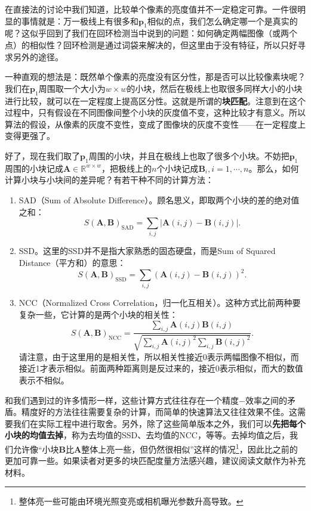 在直接法的讨论中我们知道，比较单个像素的亮度值并不一定稳定可靠。一件很明显的事情就是：万一极线上有很多和$\bm{p}_1$相似的点，我们怎么确定哪一个是真实的呢？这似乎回到了我们在回环检测当中说到的问题：如何确定两幅图像（或两个点）的相似性？回环检测是通过词袋来解决的，但这里由于没有特征，所以只好寻求另外的途径。

一种直观的想法是：既然单个像素的亮度没有区分性，那是否可以比较像素块呢？我们在$\bm{p}_1$周围取一个大小为$w \times w$的小块，然后在极线上也取很多同样大小的小块进行比较，就可以在一定程度上提高区分性。这就是所谓的\textbf{块匹配}。注意到在这个过程中，只有假设在不同图像间整个小块的灰度值不变，这种比较才有意义。所以算法的假设，从像素的灰度不变性，变成了图像块的灰度不变性——在一定程度上变得更强了。

好了，现在我们取了$\bm{p}_1$周围的小块，并且在极线上也取了很多个小块。不妨把$\bm{p}_1$周围的小块记成$\bm{A} \in \mathbb{R}^{w \times w}$，把极线上的$n$个小块记成$\bm{B}_i, i=1, \cdots, n$。那么，如何计算小块与小块间的差异呢？有若干种不同的计算方法：

\begin{enumerate}
	\item SAD（Sum of Absolute Difference）。顾名思义，即取两个小块的差的绝对值之和：
	\begin{equation}
	S( \bm{A}, \bm{B} )_{\mathrm{SAD}} = \sum_{i,j} | \bm{A}(i,j) - \bm{B}(i,j) |.
	\end{equation}
	\item SSD。这里的SSD并不是指大家熟悉的固态硬盘，而是Sum of Squared Distance（平方和）的意思：
	\begin{equation}
	S( \bm{A}, \bm{B} )_{\mathrm{SSD}} = \sum_{i,j} \left( \bm{A}(i,j) - \bm{B}(i,j) \right)^2.
	\end{equation}
	\item NCC（Normalized Cross Correlation，归一化互相关）。这种方式比前两种要复杂一些，它计算的是两个小块的相关性：
	\begin{equation}
	S( \bm{A}, \bm{B} )_{\mathrm{NCC}} = \frac{{\sum\limits_{i,j} {\bm{A}(i,j)\bm{B}(i,j)} }}{{\sqrt {\sum\limits_{i,j} {\bm{A}{{(i,j)}^2}\sum\limits_{i,j} {\bm{B}{{(i,j)}^2}} } } }}.
	\end{equation}
	请注意，由于这里用的是相关性，所以相关性接近0表示两幅图像不相似，而接近1才表示相似。前面两种距离则是反过来的，接近0表示相似，而大的数值表示不相似。
\end{enumerate}

\clearpage
和我们遇到过的许多情形一样，这些计算方式往往存在一个精度−效率之间的矛盾。精度好的方法往往需要复杂的计算，而简单的快速算法又往往效果不佳。这需要我们在实际工程中进行取舍。另外，除了这些简单版本之外，我们可以\textbf{先把每个小块的均值去掉}，称为去均值的SSD、去均值的NCC，等等。去掉均值之后，我们允许像“小块$\bm{B}$比$\bm{A}$整体上亮一些，但仍然很相似”这样的情况\footnote{整体亮一些可能由环境光照变亮或相机曝光参数升高导致。}，因此比之前的更加可靠一些。如果读者对更多的块匹配度量方法感兴趣，建议阅读文献\cite{stereo-matching-website, Hirschmuller2007}作为补充材料。

